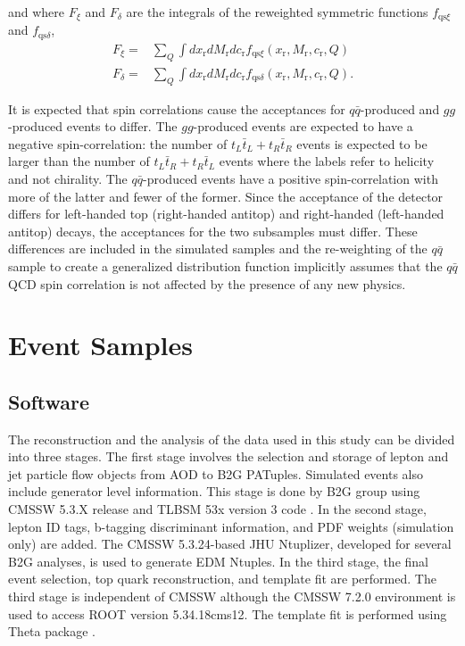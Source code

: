 \documentclass{cmspaperpdf}
\begin{document}
and where $F_\xi$ and $F_\delta$ are the integrals of the reweighted symmetric functions $f_{\mathrm{qs}\xi}$ and $f_{\mathrm{qs}\delta}$,
\begin{align}
 F_{\xi}=& \sum_{Q}\int dx_\mathrm{r} dM_\mathrm{r} dc_\mathrm{r} f_{\mathrm{qs}\xi}(x_\mathrm{r}, M_\mathrm{r}, c_\mathrm{r},Q) \\
  F_{\delta}=& \sum_{Q}\int dx_\mathrm{r} dM_\mathrm{r} dc_\mathrm{r} f_{\mathrm{qs}\delta}(x_\mathrm{r}, M_\mathrm{r}, c_\mathrm{r},Q).
 \end{align}

It is expected that spin correlations cause the acceptances for $q\bar q$-produced and $gg$-produced events to differ.  The $gg$-produced events are expected to have a negative spin-correlation: the number of $t_L\bar t_L+t_R\bar t_R$ events is expected to be larger than the number of $t_L\bar t_R+t_R\bar t_L$ events where the labels refer to helicity and not chirality.  The $q\bar q$-produced events have a positive spin-correlation with more of the latter and fewer of the former.  Since the acceptance of the detector differs for left-handed top (right-handed antitop) and right-handed (left-handed antitop) decays, the acceptances for the two subsamples must differ.  These differences are included in the simulated samples and the re-weighting of the $q\bar q$ sample to create a generalized distribution function implicitly assumes that the $q\bar q$ QCD spin correlation is not affected by the presence of any new physics.

\section{Event Samples}
\label{sec:samples}

\subsection{Software}
The reconstruction and the analysis of the data used in this study can be divided into three stages.  The first stage involves the selection and storage of lepton and jet particle flow objects from AOD to B2G PATuples.  Simulated events also include generator level information.  This stage is done by B2G group using CMSSW 5.3.X release and TLBSM 53x version 3 code \cite{B2G_twiki}.  In the second stage, lepton ID tags, b-tagging discriminant information, and PDF weights (simulation only) are added.  The  CMSSW 5.3.24-based JHU Ntuplizer, developed for several B2G analyses, is used to generate EDM Ntuples.  In the third stage, the final event selection, top quark reconstruction, and template fit are performed. The third stage is independent of CMSSW although the CMSSW 7.2.0 environment is used to access ROOT version 5.34.18cms12. The template fit is performed using Theta package \cite{ref_theta}.
  
\end{document}
